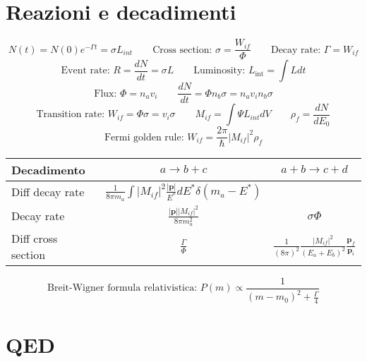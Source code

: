 \documentclass[10pt, onecolumn, a4paper]{article}
\def\bb{\mathbf}
\def\({\left(}
\def\){\right)}
\begin{document}
\section{Reazioni e decadimenti} %
$$N\(t\)=N\(0\)e^{-\Gamma t}=\sigma L_{int} \qquad \textrm{Cross section: } \sigma=\frac{W_{if}}{\Phi} \qquad \textrm{Decay rate: }\Gamma=W_{if}$$
$$\textrm{Event rate: }R=\frac{dN}{dt}=\sigma L \qquad \textrm{Luminosity: }L_{\textrm{int}}=\int{L dt}$$
$$\textrm{Flux: } \Phi=n_av_i \qquad \frac{dN}{dt}=\Phi n_b\sigma=n_av_in_b\sigma$$
$$\textrm{Transition rate: } W_{if}=\Phi\sigma=v_i\sigma \qquad M_{if}=\int{\Psi L_{int}dV} \qquad \rho_f=\frac{dN}{dE_0}$$
$$\textrm{Fermi golden rule: } W_{if}=\frac{2\pi}{\hbar}|M_{if}|^2\rho_f$$

\begin{center}
\begin{tabularx}{\textwidth}{l | c | c}
\toprule
Decadimento & $a \to b+c$ & $a+b \to c+d$ \\
\midrule
Diff decay rate & $\frac{1}{8\pi m_a}\int{|M_{if}|^2\frac{|\bb{p}|}{E^*}dE^*}\delta\(m_a-E^*\)$ & \\ [2ex]
Decay rate & $\frac{|\bb{p}||M_{if}|^2}{8\pi m_a^2}$ & $\sigma\Phi$ \\ [2ex]
Diff cross section & $\frac{\Gamma}{\Phi}$ & $\frac{1}{\(8\pi\)^2}\frac{|M_{if}|^2}{\(E_a+E_b\)^2}\frac{\bb{p}_f}{\bb{p}_i}$ \\ [2ex]
\bottomrule
\end{tabularx}
\end{center}
$$\textrm{Breit-Wigner formula relativistica: }P\(m\)\propto \frac{1}{\(m-m_0\)^2+\frac{\Gamma}{4}}$$

\section{QED} %
\end{document}
